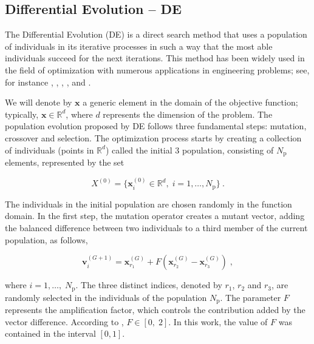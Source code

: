 \documentclass[smallextended]{svjour3}       %
\begin{document}
\subsection{Differential Evolution -- DE}
\label{sec:DE}

The Differential Evolution (DE) is a direct search method that uses a population of individuals in its iterative processes in such a way that the most able individuals succeed for the next iterations. This method has been widely used in the field of optimization with numerous applications in engineering problems; see, for instance \cite{bib:4580136}, \cite{bib:4441675}, \cite{bib:lobato2008}, \cite{bib:SACCO20091093}, \cite{bib:Regulwar2010} and \cite{bib:LOBATO2010}.

We will denote by $\boldsymbol{x}$ a generic element in the domain of the objective function; typically, $\boldsymbol{x} \in \mathbb{R}^{d}$, where $d$ represents the dimension of the problem. The population evolution proposed by DE follows three fundamental steps: mutation, crossover and selection. The optimization process starts by creating a collection of individuals (points in $\mathbb{R}^{d}$) called the initial
3
 population, consisting of $N_{\text{p}}$ elements, represented by the set

\begin{equation}
\label{eq:pop_inicial}
X^{(0)} = \{\boldsymbol{x}_{i} ^{(0)} \in \mathbb{R}^{d}, \; i = 1, \dots, N_{\text{p}}\} \: .
\end{equation}

The individuals in the initial population are chosen randomly in the function domain. In the first step, the mutation operator creates a mutant vector, adding the balanced difference between two individuals to a third member of the current population, as follows,

\begin{equation} \label{eq:mutacao_DE_canonica}
\boldsymbol{v}_{i}^{\left(G+1\right)} = \boldsymbol{x}_{r_{1}}^{\left(G\right)} + F\left(\boldsymbol{x}_{r_{2}}^{\left(G\right)} - \boldsymbol{x}_{r_{3}}^{\left(G\right)}\right) \; ,
\end{equation}

\noindent where $i = 1, \dots, \; N_{\text{p}}$. The three distinct indices, denoted by $ r_{1} $, $ r_{2} $ and $ r_{3} $, are randomly selected in the individuals of the population $N_{\text{p}}$. The parameter $ F $ represents the amplification factor, which controls the contribution added by the vector difference. According to \cite{bib:storn1997differential}, $ F \in \left[0,\;2\right] $. In this work, the value of $F$ was contained in the interval $[0,1]$.
\end{document}
